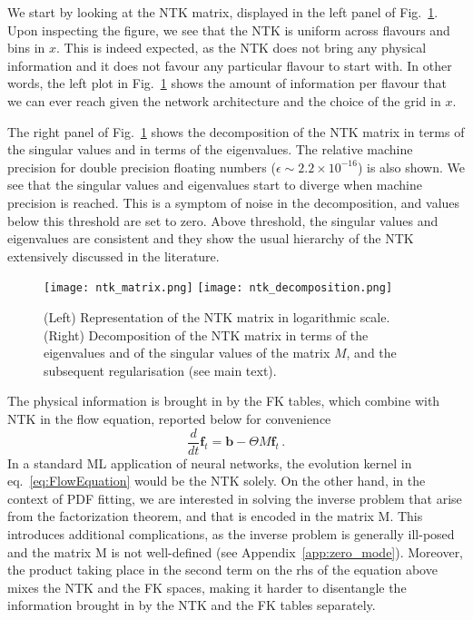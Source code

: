 \documentclass[11pt]{article}
\begin{document}
We start by looking at the NTK matrix, displayed in the left panel of
Fig.~\ref{fig:NTKDecomposition}. Upon inspecting the figure, we see that the NTK
is uniform across flavours and bins in $x$. This is indeed expected, as the NTK
does not bring any physical information and it does not favour any particular
flavour to start with. In other words, the left plot in Fig.~\ref{fig:NTKDecomposition} 
shows the amount of information per flavour that we can ever reach given 
the network architecture and the choice of the grid in $x$.

The right panel of Fig.~\ref{fig:NTKDecomposition} shows the decomposition of
the NTK matrix in terms of the singular values and in terms of the eigenvalues.
The relative machine precision for double precision floating numbers ($\epsilon
\sim 2.2 \times 10^{-16}$) is also shown. We see that the singular values and
eigenvalues start to diverge when machine precision is reached. This is a
symptom of noise in the decomposition, and values below this threshold are set
to zero. Above threshold, the singular values and eigenvalues are consistent
and they show the usual hierarchy of the NTK extensively discussed in the
literature.
\begin{figure}[!t]
  \centering
  \texttt{[image: ntk\_matrix.png]}
  \hspace{0.05\textwidth}
  \texttt{[image: ntk\_decomposition.png]}
  \caption{\small (Left) Representation of the NTK matrix in logarithmic scale. 
          (Right) Decomposition of the NTK matrix in terms of the eigenvalues and of the
          singular values of the matrix $M$, and the subsequent regularisation (see main text).}
  \label{fig:NTKDecomposition}
\end{figure}

The physical information is brought in by the FK tables, which combine with NTK
in the flow equation, reported below for convenience
\begin{equation}
  \frac{d}{dt}\pmb{f}_t = \pmb{b} - \Theta M \pmb{f}_t \,.
  \label{eq:FlowEquation}
\end{equation}
In a standard ML application of neural networks, the evolution kernel in
eq.~\ref{eq:FlowEquation} would be the NTK solely. On the other hand, in the
context of PDF fitting, we are interested in solving the inverse problem that
arise from the factorization theorem, and that is encoded in the matrix M. This
introduces additional complications, as the inverse problem is generally
ill-posed and the matrix M is not well-defined (see
Appendix~\ref{app:zero_mode}). Moreover, the product taking place in the second
term on the rhs of the equation above mixes the NTK and the FK spaces, making it
harder to disentangle the information brought in by the NTK and the FK tables
separately. 
\end{document}
